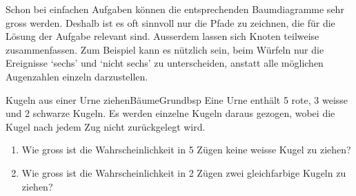 Schon bei einfachen Aufgaben können die entsprechenden Baumdiagramme sehr gross werden. Deshalb ist es oft sinnvoll nur die Pfade zu zeichnen, die für die Lösung der Aufgabe relevant sind. Ausserdem lassen sich Knoten teilweise zusammenfassen. Zum Beispiel kann es nützlich sein, beim Würfeln nur die Ereignisse `sechs' und `nicht sechs' zu unterscheiden, anstatt alle möglichen Augenzahlen einzeln darzustellen.
\begin{bsp}
  {Kugeln aus einer Urne ziehen}{BäumeGrundbsp}
  Eine Urne enthält 5 rote, 3 weisse und 2 schwarze Kugeln. Es werden einzelne Kugeln daraus gezogen, wobei die Kugel nach jedem Zug nicht zurückgelegt wird.
  \begin{enumerate}
    \item Wie gross ist die Wahrscheinlichkeit in 5 Zügen keine weisse Kugel zu ziehen?
    \item Wie gross ist die Wahrscheinlichkeit in 2 Zügen zwei gleichfarbige Kugeln zu ziehen?
  \end{enumerate}

  \vspace*{10cm}
\end{bsp}


